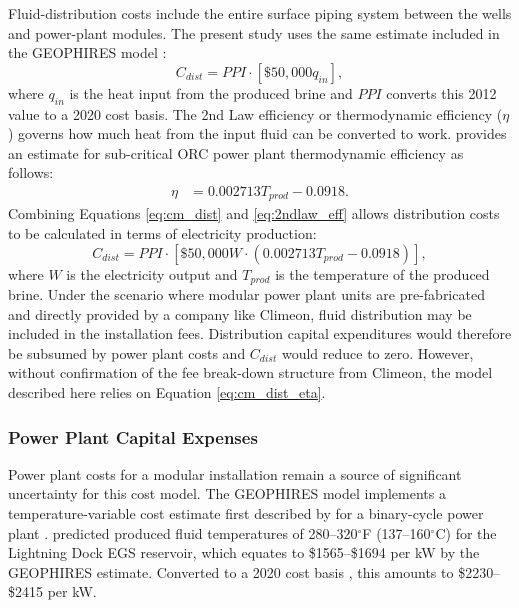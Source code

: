 Fluid-distribution costs include the entire surface piping system between the wells and power-plant modules. The present study uses the same estimate included in the GEOPHIRES model \citep{beckers_introducing_2013}:
\begin{equation}
\label{eq:cm_dist}
    C_{dist} = PPI \cdot \left[ \$50,000 %
    q_{in} \right],
\end{equation}
where $q_{in}$ is the heat input from the produced brine and $PPI$ converts this 2012 value to a 2020 cost basis. 
The 2nd Law efficiency or thermodynamic efficiency ($\eta$) governs how much heat from the input fluid can be converted to work.  \citet[pp.\ 39--41]{beckers_low-temperature_2016} provides an estimate for sub-critical ORC power plant thermodynamic efficiency as follows:
\begin{equation}
\begin{aligned}
    \label{eq:2ndlaw_eff}
    \eta %
         &= 0.002713 %
         T_{prod} - 0.0918.
\end{aligned}
\end{equation}
Combining Equations \ref{eq:cm_dist} and \ref{eq:2ndlaw_eff} allows distribution costs to be calculated in terms of electricity production:
\begin{equation}
\label{eq:cm_dist_eta}
    C_{dist} = PPI \cdot \left[ \$50,000 %
    W \cdot (0.002713 %
    T_{prod} - 0.0918) \right],
\end{equation}
where $W$ is the electricity output and $T_{prod}$ is the temperature of the produced brine. Under the scenario where modular power plant units are pre-fabricated and directly provided by a company like Climeon, fluid distribution may be included in the installation fees. Distribution capital expenditures would therefore be subsumed by power plant costs and $C_{dist}$ would reduce to zero. However, without confirmation of the fee break-down structure from Climeon, the model described here relies on Equation \ref{eq:cm_dist_eta}. 

\subsubsection{Power Plant Capital Expenses}\label{ch4:cm_capex_pp}

Power plant costs for a modular installation remain a source of significant uncertainty for this cost model. The GEOPHIRES model implements a temperature-variable cost estimate first described by \citet{tester_future_2006} for a binary-cycle power plant \citep{beckers_introducing_2013}. \citet{schochet_development_2001} predicted produced fluid temperatures of 280--320$^\circ$F (137--160$^\circ$C) for the Lightning Dock EGS reservoir, which equates to \$1565--\$1694 per kW by the GEOPHIRES estimate. Converted to a 2020 cost basis \citep{us_bls_ppi_2021}, this amounts to \$2230--\$2415 per kW.


